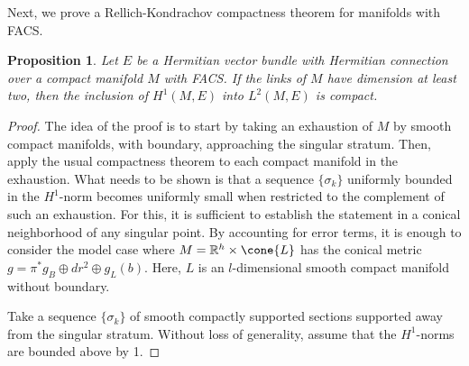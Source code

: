 \documentclass[12pt, reqno]{amsart}
\theoremstyle{plain} %
\newtheorem{proposition}[theorem]{Proposition}
\theoremstyle{definition}
\theoremstyle{remark}
\numberwithin{equation}{section}
\newcommand{\field}[1]{\mathbb{#1}}
\newcommand{\R}{\field{R}}
\newcommand{\hdim}{h} %
\newcommand{\ldim}{l} %
\begin{document}
Next, we prove a Rellich-Kondrachov compactness theorem for manifolds with FACS.
\begin{proposition}\label{prop:compactness theorem for facs manifolds}
    Let \(E\) be a Hermitian vector bundle with Hermitian connection over a compact manifold \(M\) with FACS.
    If the links of \(M\) have dimension at least two, then the inclusion of \(H^1(M, E)\) into \(L^2(M, E)\) is compact.
\end{proposition}
\begin{proof}
    The idea of the proof is to start by taking an exhaustion of \(M\) by smooth compact manifolds, with boundary, approaching the singular stratum.
    Then, apply the usual compactness theorem to each compact manifold in the exhaustion.
    What needs to be shown is that a sequence \(\{\sigma_k\}\) uniformly bounded in the \(H^1\)-norm becomes uniformly small when restricted to the complement of such an exhaustion.
    For this, it is sufficient to establish the statement in a conical neighborhood of any singular point.
    By accounting for error terms, it is enough to consider the model case where \(M = \R^\hdim \times \cone{L}\) has the conical metric \(g = \pi^*g_B \oplus dr^2 \oplus g_L(b)\).
    Here, \(L\) is an \(\ldim\)-dimensional smooth compact manifold without boundary.

    Take a sequence \(\{\sigma_k\}\) of smooth compactly supported sections supported away from the singular stratum.
    Without loss of generality, assume that the \(H^1\)-norms are bounded above by 1.


\end{proof}
\end{document}

